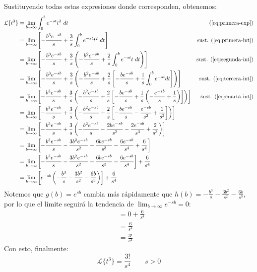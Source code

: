 \documentclass[12pt, a4paper]{article}
\begin{document}
Sustituyendo todas estas expresiones donde corresponden, obtenemos:
\begin{align*}
    \mathcal{L}\{t^3\} &= \lim_{b\to\infty}\int_0^b e^{-st}t^3\ dt & (\ref{eq:primera-exp}) \\
	&=\lim_{b\to\infty} \left[ -\frac{b^3e^{-sb}}{s}+\frac{3}{s}\int_0^b e^{-st}t^2\ dt \right] & \text{sust. } (\ref{eq:primera-int}) \\
    &=\lim_{b\to\infty} \left[ -\frac{b^3e^{-sb}}{s}+\frac{3}{s}\left(-\frac{b^2e^{-sb}}{s}+\frac{2}{s}\int_0^b e^{-st}t\ dt\right) \right] & \text{sust. } (\ref{eq:segunda-int}) \\
    &=\lim_{b\to\infty} \left[ -\frac{b^3e^{-sb}}{s}+\frac{3}{s}\left(-\frac{b^2e^{-sb}}{s}+\frac{2}{s}\left[-\frac{be^{-sb}}{s}+\frac{1}{s}\int_0^b e^{-st}dt\right]\right) \right] & \text{sust. } (\ref{eq:tercera-int}) \\
    &=\lim_{b\to\infty} \left[ -\frac{b^3e^{-sb}}{s}+\frac{3}{s}\left(-\frac{b^2e^{-sb}}{s}+\frac{2}{s}\left[-\frac{be^{-sb}}{s}+\frac{1}{s}\left(-\frac{e^{-sb}}{s}+\frac{1}{s}\right)\right]\right) \right] & \text{sust. } (\ref{eq:cuarta-int}) \\
    &=\lim_{b\to\infty} \left[ -\frac{b^3e^{-sb}}{s}+\frac{3}{s}\left(-\frac{b^2e^{-sb}}{s}+\frac{2}{s}\left[-\frac{be^{-sb}}{s}-\frac{e^{-sb}}{s^2}+\frac{1}{s^2}\right]\right) \right] \\
    &=\lim_{b\to\infty} \left[ -\frac{b^3e^{-sb}}{s}+\frac{3}{s}\left(-\frac{b^2e^{-sb}}{s}-\frac{2be^{-sb}}{s^2}-\frac{2e^{-sb}}{s^3}+\frac{2}{s^3}\right) \right] \\
    &=\lim_{b\to\infty} \left[ -\frac{b^3e^{-sb}}{s}-\frac{3b^2e^{-sb}}{s^2}-\frac{6be^{-sb}}{s^3}-\frac{6e^{-sb}}{s^4}+\frac{6}{s^4} \right] \\
    &=\lim_{b\to\infty} \left[ -\frac{b^3e^{-sb}}{s}-\frac{3b^2e^{-sb}}{s^2}-\frac{6be^{-sb}}{s^3}-\frac{6e^{-sb}}{s^4} \right] + \frac{6}{s^4} \\
    &=\lim_{b\to\infty} \left[ e^{-sb} \left( -\frac{b^3}{s}-\frac{3b^2}{s^2}-\frac{6b}{s^3} \right) \right] + \frac{6}{s^4}
\end{align*}
Notemos que \(g(b) = e^{sb}\) cambia más rápidamente que \(h(b) = -\frac{b^3}{s}-\frac{3b^2}{s^2}-\frac{6b}{s^3}\), por lo que el límite seguirá la tendencia de \(\lim_{b \to \infty} e^{-sb} = 0\):
\begin{align*}
	&= 0 + \frac{6}{s^{4}} \\
    &=\frac{6}{s^4} \\
	&=\frac{3!}{s^4}
\end{align*}
Con esto, finalmente:
\[
\mathcal{L}\{t^3\}=\frac{3!}{s^4} \qquad s > 0
\]
\end{document}
